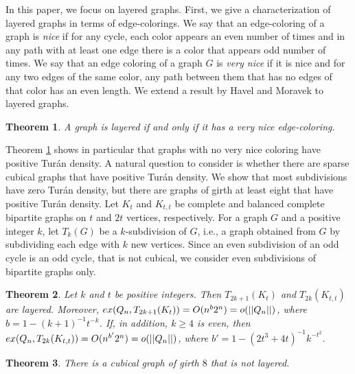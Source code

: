 \documentclass[11pt, a4paper]{article}
\newtheorem{theorem}{Theorem}
\newcommand{\ex}{{\rm  ex}}
\begin{document}
In this paper, we focus on layered graphs.  First, we  give a characterization of layered graphs in terms of edge-colorings. 
We say that an edge-coloring of a graph is {\it nice} if for any cycle, each color appears an even number of times and in any path with at least one edge there is a color that appears odd number of times. We say that an edge coloring of a graph $G$ is {\it very nice} if  it is nice and for any two edges of the same color, any path between them that has no edges of that color has an even length. We extend a result by Havel and Moravek \cite{HM} to layered graphs. 

\begin{theorem}\label{very-nice-intro}
A graph is layered if and only if it has a very nice edge-coloring. 
\end{theorem}





Theorem \ref{very-nice-intro}  shows in particular that graphs with no very nice coloring 
have positive Tur\'an density.   A natural question to consider is whether there are sparse cubical graphs that have positive Tur\'an density. We show that most subdivisions have zero Tur\'an density, but there are graphs of girth at least eight that have positive Tur\'an density.  Let $K_t$ and $K_{t,t}$ be complete and balanced complete bipartite graphs on $t$ and $2t$ vertices, respectively. For a graph $G$ and a positive integer $k$, let $T_k(G)$ be a $k$-subdivision of $G$, i.e., a graph obtained from $G$ by subdividing each edge with $k$ new vertices. Since an even subdivision of an odd cycle is an odd cycle, that is not cubical, we consider even subdivisions of bipartite graphs only. 

\begin{theorem}\label{subdivisions}
Let $k$ and $t$ be positive integers.
Then $T_{2k+1}(K_t)$ and $T_{2k}(K_{t,t})$ are  layered. Moreover, 
$\ex(Q_n, T_{2k+1}(K_t)) = O(n^b2^n)= o(||Q_n||)$, where $b=1-(k+1)^{-1}t^{-k}$.
If, in addition,  $k\geq 4$ is even,  then 
$\ex(Q_n, T_{2k}(K_{t,t})) = O( n^{b'}2^n) = o(||Q_n||)$, where $b'= 1 -(2t^3+4t)^{-1}k^{-t^2}$.
\end{theorem}	


\begin{theorem}\label{girth8}
There is a cubical graph of girth $8$ that is not layered. 
\end{theorem} 
\end{document}
